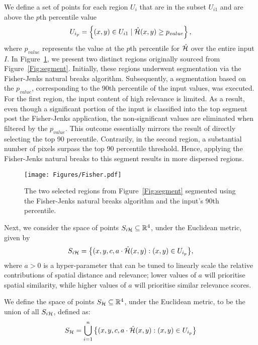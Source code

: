 We define a set of points for each region $U_i$ that are in the subset $U_{i1}$ and are above the $p$th percentile value
\begin{equation*}
    U_{i_p} = \left\{ (x, y) \in U_{i1} \mid \hat{\mathcal{H}}(x,y) \geq p_{value} \right\},
\end{equation*}
where $p_{value}$ represents the value at the $p$th percentile for $\hat{\mathcal{H}}$ over the entire input $I$. In Figure~\ref{Fig:Fisher}, we present two distinct regions originally sourced from Figure~\ref{Fig:segment}. Initially, these regions underwent segmentation via the Fisher-Jenks natural breaks algorithm. Subsequently, a segmentation based on the $p_{value}$, corresponding to the 90th percentile of the input values, was executed. For the first region, the input content of high relevance is limited. As a result, even though a significant portion of the input is classified into the top segment post the Fisher-Jenks application, the non-significant values are eliminated when filtered by the $p_{value}$. This outcome essentially mirrors the result of directly selecting the top 90 percentile. Contrarily, in the second region, a substantial number of pixels surpass the top 90 percentile threshold. Hence, applying the Fisher-Jenks natural breaks to this segment results in more dispersed regions.

\begin{figure}[ht!]
	\begin{center}
		\texttt{[image: Figures/Fisher.pdf]}
	\end{center}
	\caption{The two selected regions from Figure~\ref{Fig:segment} segmented using the Fisher-Jenks natural breaks algorithm and the input's 90th percentile.}
	\label{Fig:Fisher}
\end{figure} 

Next, we consider the space of points $S_{i\mathcal{H}}\subseteq \mathbb{R}^4$, under the Euclidean metric, given by
\begin{equation*}
    S_{i\mathcal{H}} = \big\{(x,y,c, a\cdot \hat{\mathcal{H}}(x,y) : (x,y)\in U_{i_p}\big\},
\end{equation*}
where $a>0$ is a hyper-parameter that can be tuned to linearly scale the relative contributions of spatial distance and relevance; lower values of $a$ will prioritise spatial similarity, while higher values of $a$ will prioritise similar relevance scores.

We define the space of points $S_{\mathcal{H}}\subseteq \mathbb{R}^4$, under the Euclidean metric, to be the union of all $S_{i\mathcal{H}}$, defined as:
\begin{equation}
    S_{\mathcal{H}} = \bigcup_{i=1}^{n} \big\{(x,y,c, a\cdot \hat{\mathcal{H}}(x,y) : (x,y)\in U_{i_p}\big\}
\label{eq:set_of_points}   
\end{equation}

